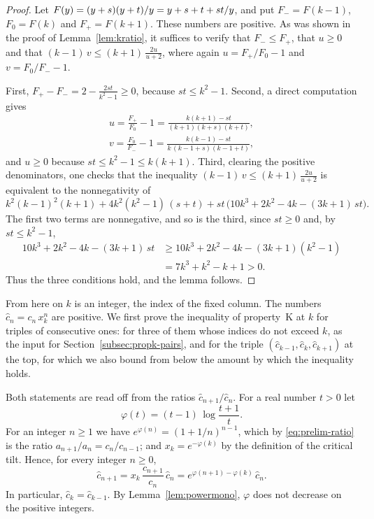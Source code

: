 \documentclass{amsart}
\makeatletter
\theoremstyle{definition}
\theoremstyle{remark}
\numberwithin{equation}{section}
\def\subsection{\@startsection{subsection}{2}\z@{.5\linespacing\@plus.7\linespacing}{-.5em}{\normalfont\bfseries\boldmath}}
\makeatother
\begin{document}
\begin{proof}
Let $F(y)=(y+\nobreak s)(y+\nobreak t)/y=y+s+t+st/y$, and put $F_-=F(k-1)$, $F_0=F(k)$ and $F_+=F(k+1)$. These numbers are positive. As was shown in the proof of Lemma~\ref{lem:kratio}, it suffices to verify that $F_-\le F_+$, that $u\ge 0$ and that $(k-1)\,v\le(k+1)\,\frac{2u}{u+2}$, where again $u=F_+/F_0-1$ and $v=F_0/F_--1$.

First, $F_+-F_-=2-\frac{2st}{k^2-1}\ge 0$, because $st\le k^2-1$. Second, a direct computation gives
\begin{gather*}
u=\frac{F_+}{F_0}-1=\frac{k(k+1)-st}{(k+1)(k+s)(k+t)},\\
v=\frac{F_0}{F_-}-1=\frac{k(k-1)-st}{k\,(k-1+s)(k-1+t)},
\end{gather*}
and $u\ge 0$ because $st\le k^2-1\le k(k+1)$. Third, clearing the positive denominators, one checks that the inequality $(k-1)\,v\le(k+1)\,\frac{2u}{u+2}$ is equivalent to the nonnegativity of
\[
k^2(k-1)^2(k+1)+4k^2(k^2-1)\,(s+t)+st\,\bigl(10k^3+2k^2-4k-(3k+1)\,st\bigr).
\]
The first two terms are nonnegative, and so is the third, since $st\ge 0$ and, by $st\le k^2-1$,
\begin{align*}
10k^3+2k^2-4k-(3k+1)\,st&\ge 10k^3+2k^2-4k-(3k+1)(k^2-1)\\
&=7k^3+k^2-k+1>0.
\end{align*}
Thus the three conditions hold, and the lemma follows.
\end{proof}

\subsection{The numbers $\hat c_n$}\label{subsec:propk-cayley}

From here on $k$ is an integer, the index of the fixed column. The numbers $\hat c_n=c_n\,x_k^{n}$ are positive. We first prove the inequality of property~K at $k$ for triples of consecutive ones: for three of them whose indices do not exceed $k$, as the input for Section~\ref{subsec:propk-pairs}, and for the triple $(\hat c_{k-1},\hat c_k,\hat c_{k+1})$ at the top, for which we also bound from below the amount by which the inequality holds.

Both statements are read off from the ratios $\hat c_{n+1}/\hat c_n$. For a real number $t>0$ let
\[
\varphi(t)=(t-1)\,\log\frac{t+1}{t}.
\]
For an integer $n\ge 1$ we have $e^{\varphi(n)}=(1+1/n)^{n-1}$, which by \eqref{eq:prelim-ratio} is the ratio $a_{n+1}/a_n=c_n/c_{n-1}$; and $x_k=e^{-\varphi(k)}$ by the definition of the critical tilt. Hence, for every integer $n\ge 0$,
\begin{equation}\label{eq:propk-ratio}
\hat c_{n+1}=x_k\,\frac{c_{n+1}}{c_n}\,\hat c_n=e^{\varphi(n+1)-\varphi(k)}\,\hat c_n.
\end{equation}
In particular, $\hat c_k=\hat c_{k-1}$. By Lemma~\ref{lem:powermono}, $\varphi$ does not decrease on the positive integers.
\end{document}
